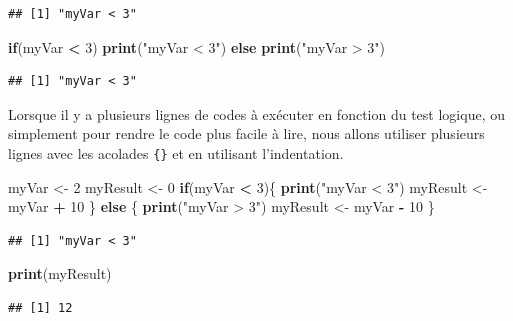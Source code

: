 \documentclass[
]{book}
\newenvironment{Shaded}{\begin{snugshade}}{\end{snugshade}}
\newcommand{\ControlFlowTok}[1]{\textcolor[rgb]{0.13,0.29,0.53}{\textbf{#1}}}
\newcommand{\DecValTok}[1]{\textcolor[rgb]{0.00,0.00,0.81}{#1}}
\newcommand{\KeywordTok}[1]{\textcolor[rgb]{0.13,0.29,0.53}{\textbf{#1}}}
\newcommand{\NormalTok}[1]{#1}
\newcommand{\OperatorTok}[1]{\textcolor[rgb]{0.81,0.36,0.00}{\textbf{#1}}}
\newcommand{\StringTok}[1]{\textcolor[rgb]{0.31,0.60,0.02}{#1}}
\begin{document}
\begin{verbatim}
## [1] "myVar < 3"
\end{verbatim}

\begin{Shaded}
\begin{Highlighting}[]
\ControlFlowTok{if}\NormalTok{(myVar }\OperatorTok{<}\StringTok{ }\DecValTok{3}\NormalTok{) }\KeywordTok{print}\NormalTok{(}\StringTok{"myVar < 3"}\NormalTok{) }\ControlFlowTok{else} \KeywordTok{print}\NormalTok{(}\StringTok{"myVar > 3"}\NormalTok{)}
\end{Highlighting}
\end{Shaded}

\begin{verbatim}
## [1] "myVar < 3"
\end{verbatim}

Lorsque il y a plusieurs lignes de codes à exécuter en fonction du test logique, ou simplement pour rendre le code plus facile à lire, nous allons utiliser plusieurs lignes avec les acolades \texttt{\{\}} et en utilisant l'indentation.

\begin{Shaded}
\begin{Highlighting}[]
\NormalTok{myVar <-}\StringTok{ }\DecValTok{2}
\NormalTok{myResult <-}\StringTok{ }\DecValTok{0}
\ControlFlowTok{if}\NormalTok{(myVar }\OperatorTok{<}\StringTok{ }\DecValTok{3}\NormalTok{)\{}
  \KeywordTok{print}\NormalTok{(}\StringTok{"myVar < 3"}\NormalTok{)}
\NormalTok{  myResult <-}\StringTok{ }\NormalTok{myVar }\OperatorTok{+}\StringTok{ }\DecValTok{10}
\NormalTok{\} }\ControlFlowTok{else}\NormalTok{ \{}
  \KeywordTok{print}\NormalTok{(}\StringTok{"myVar > 3"}\NormalTok{)}
\NormalTok{  myResult <-}\StringTok{ }\NormalTok{myVar }\OperatorTok{-}\StringTok{ }\DecValTok{10}
\NormalTok{\}}
\end{Highlighting}
\end{Shaded}

\begin{verbatim}
## [1] "myVar < 3"
\end{verbatim}

\begin{Shaded}
\begin{Highlighting}[]
\KeywordTok{print}\NormalTok{(myResult)}
\end{Highlighting}
\end{Shaded}

\begin{verbatim}
## [1] 12
\end{verbatim}
\end{document}
